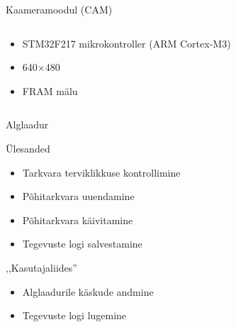 \documentclass[pdf]{beamer}
\begin{document}
\begin{frame}{Kaameramoodul (CAM)}
    \begin{columns}
        \begin{column}{0.5\textwidth}
            \begin{itemize}
                \item STM32F217 mikrokontroller (ARM Cortex-M3)
                \item 640\(\times\)480 
                \item FRAM mälu
            \end{itemize}
        \end{column}
        \begin{column}{0.5\textwidth}
        \end{column}
    \end{columns}
\end{frame}

\begin{frame}{Alglaadur}
    \begin{block}{Ülesanded}
        \begin{itemize}
            \item Tarkvara terviklikkuse kontrollimine
            \item Põhitarkvara uuendamine
            \item Põhitarkvara käivitamine
            \item Tegevuste logi salvestamine
        \end{itemize}
    \end{block}
    \begin{block}{,,Kasutajaliides''}
        \begin{itemize}
            \item Alglaadurile käskude andmine
            \item Tegevuste logi lugemine
        \end{itemize}
    \end{block}
\end{frame}
\end{document}
